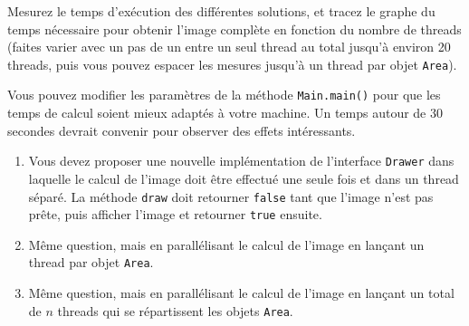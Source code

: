 \documentclass{td}
\begin{document}
Mesurez le temps d'exécution des différentes solutions, et tracez le graphe du temps nécessaire pour obtenir l'image complète en
fonction du nombre de threads (faites varier avec un pas de un entre un seul thread au total
jusqu'à environ 20 threads, puis vous pouvez espacer les mesures jusqu'à un thread par objet \lstinline{Area}).

Vous pouvez modifier les paramètres de la méthode \lstinline{Main.main()}
pour que les temps de calcul soient mieux adaptés à votre machine. Un temps autour de
30 secondes devrait convenir pour observer des effets intéressants.

\begin{enumerate}
\item Vous devez proposer une nouvelle implémentation de l'interface \lstinline{Drawer}
  dans laquelle le calcul de l'image doit être effectué une seule fois et dans un thread séparé.
  La méthode \lstinline{draw} doit retourner \lstinline{false} tant que l'image n'est pas prête,
  puis afficher l'image et retourner \lstinline{true} ensuite.

\item Même question, mais en parallélisant le calcul de l'image en lançant un thread par objet \lstinline{Area}.

\item Même question, mais en parallélisant le calcul de l'image en lançant un total de $n$ threads qui se répartissent les objets \lstinline{Area}.
\end{enumerate}
\end{document}

